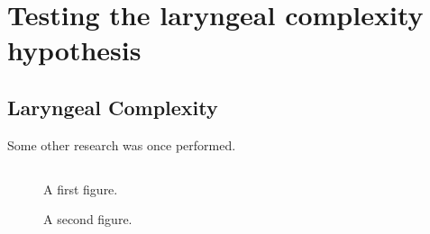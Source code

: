\chapter{Testing the laryngeal complexity hypothesis}

\section{Laryngeal Complexity}
Some other research was once performed.

\section{}
\begin{figure}
\caption{A first figure.}
\end{figure}

\begin{figure}
\caption{A second figure.}
\end{figure}